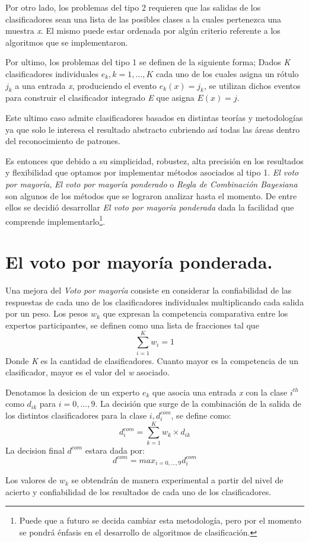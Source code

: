 Por otro lado, los problemas del tipo 2 requieren que las salidas de los clasificadores sean una lista de las posibles clases a la cuales pertenezca una muestra \textit{x}. El mismo puede estar ordenada por algún criterio referente a los algoritmos que se implementaron.

Por ultimo, los problemas del tipo 1 se definen de la siguiente forma; Dados \textit{K} clasificadores individuales $ e_{k}, k = 1,...,K $ cada uno de los cuales asigna un rótulo $ j_{k} $ a una entrada \textit{x}, produciendo el evento $ e_{k}(x) = j_{k} $, se utilizan dichos eventos para construir el clasificador integrado \textit{E} que asigna $ E(x) = j $. 

Este ultimo caso admite clasificadores basados en distintas teorías y metodologías ya que solo le interesa el resultado abstracto cubriendo así todas las áreas dentro del reconocimiento de patrones. 

Es entonces que debido a su simplicidad, robustez, alta precisión en los resultados y flexibilidad que optamos por implementar métodos asociados al tipo 1. \textit{El voto por mayoría}, \textit{El voto por mayoría ponderado} o \textit{Regla de Combinación Bayesiana} son algunos de los métodos que se lograron analizar hasta el momento. De entre ellos se decidió desarrollar \textit{El voto por mayoría ponderada} dada la facilidad que comprende implementarlo\footnote{Puede que a futuro se decida cambiar esta metodología, pero por el momento se pondrá énfasis en el desarrollo de algoritmos de clasificación.}.

\section{El voto por mayoría ponderada.}
Una mejora del \textit{Voto por mayoría} consiste en considerar la confiabilidad de las respuestas de cada uno de los clasificadores individuales multiplicando cada salida por un peso. Los pesos $ w_{k} $ que expresan la competencia comparativa entre los expertos participantes, se definen como una lista de fracciones tal que
\[ \sum_{i=1}^{K}w_{i} = 1 \]
Donde \textit{K} es la cantidad de clasificadores. Cuanto mayor es la competencia de un clasificador, mayor es el valor del \textit{w} asociado.

Denotamos la desicion de un experto $ e_{k} $ que asocia una entrada \textit{x} con la clase $ i^{th} $ como $ d_{ik} $ para $ i = 0,...,9 $. La decisión que surge de la combinación de la salida de los distintos clasificadores para la clase $ i, d_{i}^{com} $, se define como:
\[ d_{i}^{com} = \sum_{k=1}^{K}w_{k} \times d_{ik} \]
La decision final $ d^{com} $ estara dada por:
\[ d^{com} = max_{i = 0,...,9} d_{i}^{com} \]

Los valores de $ w_{k} $ se obtendrán de manera experimental a partir del nivel de acierto y confiabilidad de los resultados de cada uno de los clasificadores.
